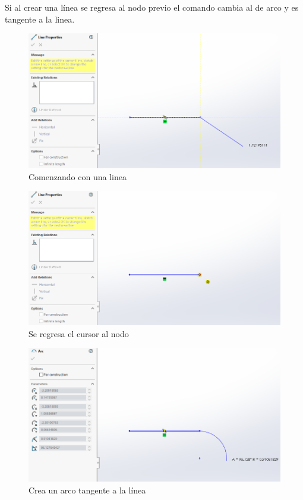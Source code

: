 \documentclass[12pt,letterpaper,final]{report}
\begin{document}
Si al crear una línea se regresa al nodo previo el comando cambia al de arco y es tangente a la linea.

\begin{figure}[H]
	\centering
	\includegraphics[width=0.85\linewidth, height=0.5\textheight,keepaspectratio]{Imagenes/solidworks_curvaconlinea01}
	\caption{Comenzando con una linea}
	\label{fig:solidworkscurvaconlinea01}
\end{figure}

\begin{figure}[H]
	\centering
	\includegraphics[width=0.85\linewidth, height=0.5\textheight,keepaspectratio]{Imagenes/solidworks_curvaconlinea02}
	\caption{Se regresa el cursor al nodo}
	\label{fig:solidworkscurvaconlinea02}
\end{figure}
\begin{figure}[H]
	\centering
	\includegraphics[width=0.85\linewidth, height=0.5\textheight,keepaspectratio]{Imagenes/solidworks_curvaconlinea03}
	\caption{Crea un arco tangente a la línea}
	\label{fig:solidworkscurvaconlinea03}
\end{figure}
\end{document}

